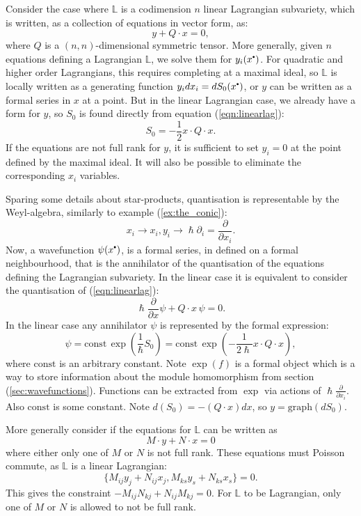     Consider the case where \(\mathbb{L}\) is a codimension \(n\) linear Lagrangian subvariety, which is written, as a collection of equations in vector form, as:
    \begin{equation}
        \label{eqn:linearlag}
        y + Q \cdot x = 0,
    \end{equation}
    where \(Q\) is a \((n,n)\)-dimensional symmetric tensor. More generally, given \(n\) equations defining a Lagrangian \( \mathbb{L}\), we solve them for \(y_i(x^{\sbt})\). For quadratic and higher order Lagrangians, this requires completing at a maximal ideal, so \( \mathbb{L}\) is locally written as a generating function \(y_i dx_i =  dS_0(x^{\sbt})\), or \(y\) can be written as a formal series in \(x\) at a point. But in the linear Lagrangian case, we already have a form for \(y\), so \(S_0\) is found directly from equation (\ref{eqn:linearlag}): 
    \[S_0 = -\frac{1}{2} x \cdot Q \cdot x. \]
    If the equations are not full rank for \(y\), it is sufficient to set \(y_i=0\) at the point defined by the maximal ideal. It will also be possible to eliminate the corresponding \(x_i\) variables.
    
    Sparing some details about star-products, quantisation is representable by the Weyl-algebra, similarly to example (\ref{ex:the_conic}): 
    \[ x_i \rightarrow x_i, y_i \rightarrow \hslash \partial_i = \frac{\partial}{\partial x_i}.\]
    Now, a wavefunction \( \psi(x^{\sbt})\), is a formal series, in defined on a formal neighbourhood, that is the annihilator of the quantisation of the equations defining the Lagrangian subvariety. In the linear case it is equivalent to consider the quantisation of (\ref{eqn:linearlag}):
    \[ \hslash \frac{\partial}{\partial x} \psi + Q \cdot x\, \psi = 0. \]
    In the linear case any annihilator \( \psi\) is represented by the formal expression:
    \[ \psi = \mathrm{const} \, \exp \left( \frac{1}{\hslash} S_0 \right) = \mathrm{const} \, \exp \left( -\frac{1}{2\hslash} x \cdot Q \cdot x \right), \]
    where \( \mathrm{const}\) is an arbitrary constant.
    Note \(\exp(f) \) is a formal object which is a way to store information about the module homomorphism from section (\ref{sec:wavefunctions}). Functions can be extracted from \(\exp\) via actions of \(\hslash \frac{\partial}{\partial x_i }\). Also \( \mathrm{const}\) is some constant. Note \(  d (S_0 ) = -(Q \cdot x) dx\), so \( y=\mathrm{graph}(dS_0)\). 
    
    More generally consider if the equations for \( \mathbb{L}\) can be written as
    \[ M \cdot y + N \cdot x = 0\]
    where either only one of \(M\) or \(N\) is not full rank. These equations must Poisson commute, as \(\mathbb{L}\) is a linear Lagrangian:
    \[ \{ M_{ij} y_j + N_{ij}x_j , M_{ks}y_s + N_{ks}x_s \} = 0.\]
    This gives the constraint \(- M_{ij} N_{kj}+N_{ij} M_{kj} = 0\). For \( \mathbb{L}\) to be Lagrangian, only one of \(M\) or \(N\) is allowed to not be full rank. 
    
